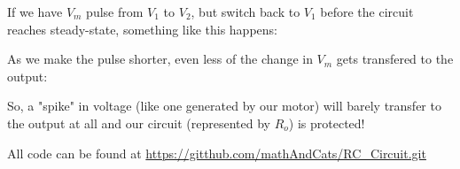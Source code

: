 \documentclass[12pt]{article}
\begin{document}
If we have $V_{m}$ pulse from $V_{1}$ to $V_{2}$, but switch back to $V_{1}$ before the circuit reaches steady-state, something like this happens:


As we make the pulse shorter, even less of the change in $V_{m}$ gets transfered to the output:


So, a "spike" in voltage (like one generated by our motor) will barely transfer to the output at all and our circuit (represented by $R_{o}$) is protected!


All code can be found at \url{https://gitthub.com/mathAndCats/RC_Circuit.git}
\end{document}
